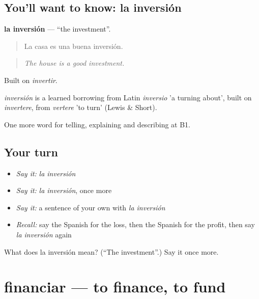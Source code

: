 \subsection*{You'll want to know: la inversión}
\textbf{la inversión} — \textquotedblleft{}the investment\textquotedblright{}.

\begin{quote}
La casa es una buena inversión.
\end{quote}

\begin{quote}
\emph{The house is a good investment.}
\end{quote}

Built on \emph{invertir}.

\begin{cousinweb}
\emph{inversión} is a learned borrowing from Latin \emph{inversio} 'a turning about', built on \emph{invertere}, from \emph{vertere} 'to turn' (Lewis \& Short).
\end{cousinweb}

\begin{grammarlens}[title={What you've built}]
One more word for telling, explaining and describing at B1.
\end{grammarlens}

\subsection*{Your turn}
\begin{itemize}
\raggedright
  \item \emph{Say it:} \emph{la inversión}
  \item \emph{Say it:} \emph{la inversión}, once more
  \item \emph{Say it:} a sentence of your own with \emph{la inversión}
  \item \emph{Recall:} say the Spanish for the loss, then the Spanish for the profit, then say \emph{la inversión} again
\end{itemize}

\begin{tcolorbox}[breakable,colback=teal!4,colframe=teal!35!black,title={Before you move on}]
What does la inversión mean? (\textquotedblleft{}The investment\textquotedblright{}.) Say it once more.
\end{tcolorbox}
\section[financiar]{financiar — to finance, to fund}

